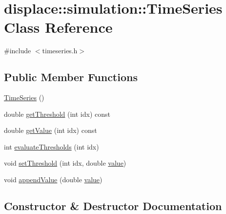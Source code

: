 \hypertarget{classdisplace_1_1simulation_1_1_time_series}{}\section{displace\+::simulation\+::Time\+Series Class Reference}
\label{classdisplace_1_1simulation_1_1_time_series}


{\ttfamily \#include $<$timeseries.\+h$>$}

\subsection*{Public Member Functions}
\begin{DoxyCompactItemize}
\item 
\mbox{\hyperlink{classdisplace_1_1simulation_1_1_time_series_a2eea12c848d5ac5a2123f79aaa06d252}{Time\+Series}} ()
\item 
double \mbox{\hyperlink{classdisplace_1_1simulation_1_1_time_series_a64ea2d59fa991e9ecc5e791f5b0030f4}{get\+Threshold}} (int idx) const
\item 
double \mbox{\hyperlink{classdisplace_1_1simulation_1_1_time_series_aa6417432419821f9b29d38efb33e5f07}{get\+Value}} (int idx) const
\item 
int \mbox{\hyperlink{classdisplace_1_1simulation_1_1_time_series_a28caff2d4561dbcfffb420999a475b49}{evaluate\+Thresholds}} (int idx)
\item 
void \mbox{\hyperlink{classdisplace_1_1simulation_1_1_time_series_a44ad443f4159dd158b7e8f70d12c9d14}{set\+Threshold}} (int idx, double \mbox{\hyperlink{diffusion_8cpp_a4b41795815d9f3d03abfc739e666d5da}{value}})
\item 
void \mbox{\hyperlink{classdisplace_1_1simulation_1_1_time_series_a70fb7f9101287116acdcc9f0adbf7baf}{append\+Value}} (double \mbox{\hyperlink{diffusion_8cpp_a4b41795815d9f3d03abfc739e666d5da}{value}})
\end{DoxyCompactItemize}


\subsection{Constructor \& Destructor Documentation}
\mbox{\label{classdisplace_1_1simulation_1_1_time_series_a2eea12c848d5ac5a2123f79aaa06d252}} 
